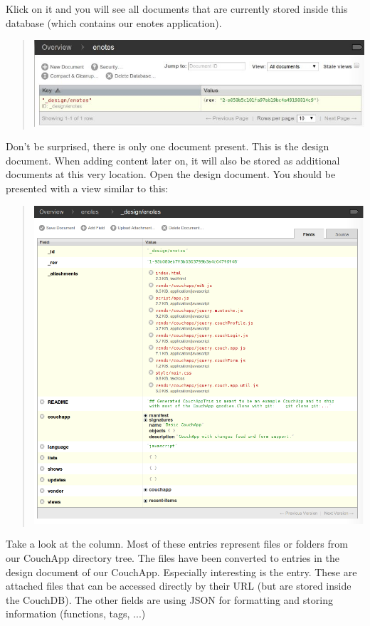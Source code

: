 \documentclass[letterpaper,10pt,english]{sphinxmanual}
\begin{document}
Klick on it and you will see all documents that are currently stored inside this database (which contains our enotes application).
\begin{quote}

\includegraphics{2_documents.jpg}
\end{quote}

Don't be surprised, there is only one document present. This is the design document. When adding content later on, it will also be stored as additional documents at this very location. Open the design document.
You should be presented with a view similar to this:
\begin{quote}

\includegraphics{2_design.png}
\end{quote}

Take a look at the  column. Most of these entries represent files or folders from our CouchApp directory tree. The files have been converted to entries in the design document of our CouchApp.
Especially interesting is the  entry. These are attached files that can be accessed directly by their URL (but are stored inside the CouchDB). The other fields are using JSON for formatting and storing information (functions, tags, ...)
\end{document}

